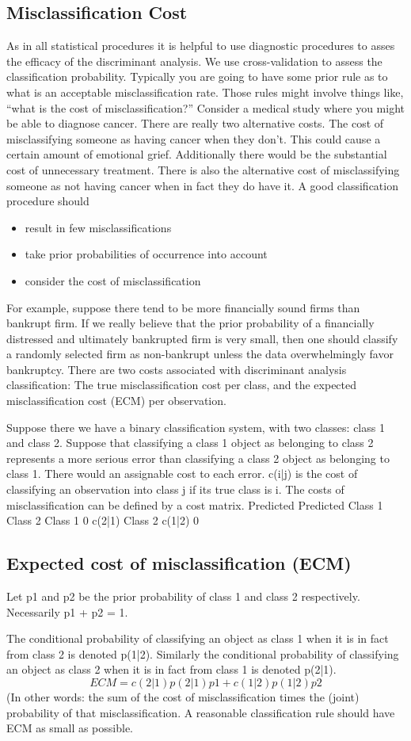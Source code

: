\subsection*{Misclassification Cost}
As in all statistical procedures it is helpful to use diagnostic procedures to
asses the efficacy of the discriminant analysis. We use cross-validation to
assess the classification probability. Typically you are going to have some
prior rule as to what is an acceptable misclassification rate.
Those rules might involve things like, “what is the cost of misclassification?”
Consider a medical study where you might be able to diagnose cancer.
There are really two alternative costs. The cost of misclassifying someone
as having cancer when they don’t. This could cause a certain amount of emotional
grief. Additionally there would be the substantial cost of unnecessary
treatment.
There is also the alternative cost of misclassifying someone as not having
cancer when in fact they do have it.
A good classification procedure should
\begin{itemize}
	\item result in few misclassifications
	\item take prior probabilities of occurrence into account
	\item consider the cost of misclassification
\end{itemize}
For example, suppose there tend to be more financially sound firms than
bankrupt firm. If we really believe that the prior probability of a financially
distressed and ultimately bankrupted firm is very small, then one should classify
a randomly selected firm as non-bankrupt unless the data overwhelmingly
favor bankruptcy.
There are two costs associated with discriminant analysis classification:
The true misclassification cost per class, and the expected misclassification
cost (ECM) per observation.

\smallskip

Suppose there we have a binary classification system, with two classes:
class 1 and class 2. Suppose that classifying a class 1 object as belonging
to class 2 represents a more serious error than classifying a class 2 object as
belonging to class 1. There would an assignable cost to each error. c(i|j) is
the cost of classifying an observation into class j if its true class is i. The
costs of misclassification can be defined by a cost matrix.
Predicted Predicted
Class 1 Class 2
Class 1 0 c(2|1)
Class 2 c(1|2) 0
\subsection*{ Expected cost of misclassification (ECM)}
Let p1 and p2 be the prior probability of class 1 and class 2 respectively.
Necessarily p1 + p2 = 1.

The conditional probability of classifying an object as class 1 when it is
in fact from class 2 is denoted p(1|2). Similarly the conditional probability
of classifying an object as class 2 when it is in fact from class 1 is denoted
p(2|1).
\[ ECM = c(2|1)p(2|1)p1 + c(1|2)p(1|2)p2\]
(In other words: the sum of the cost of misclassification times the (joint)
probability of that misclassification.
A reasonable classification rule should have ECM as small as possible.
